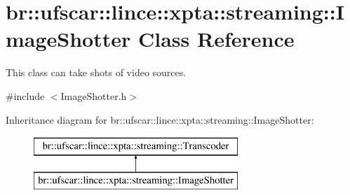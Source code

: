 \hypertarget{classbr_1_1ufscar_1_1lince_1_1xpta_1_1streaming_1_1ImageShotter}{
\section{br::ufscar::lince::xpta::streaming::ImageShotter Class Reference}
\label{classbr_1_1ufscar_1_1lince_1_1xpta_1_1streaming_1_1ImageShotter}
}


This class can take shots of video sources.  




{\ttfamily \#include $<$ImageShotter.h$>$}

Inheritance diagram for br::ufscar::lince::xpta::streaming::ImageShotter:\begin{figure}[H]
\begin{center}
\leavevmode
\includegraphics[height=2cm]{classbr_1_1ufscar_1_1lince_1_1xpta_1_1streaming_1_1ImageShotter}
\end{center}
\end{figure}
